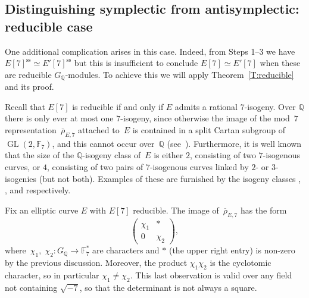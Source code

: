\documentclass[12pt, reqno]{amsart}
\newcommand{\lmfdbeciso}[2]{\href{http://www.lmfdb.org/EllipticCurve/Q/#1/#2}{\text{\rm#1#2}}}
\newcommand{\F}{\mathbb{F}}
\newcommand{\Q}{\mathbb{Q}}
\newcommand{\rhobar}{{\overline{\rho}}}
\DeclareMathOperator{\sss}{ss}
\newcommand{\GL}{\operatorname{GL}}
\numberwithin{equation}{section}
\theoremstyle{definition}
\theoremstyle{remark}
\begin{document}
\subsection{Distinguishing symplectic from antisymplectic: reducible
  case}

One additional complication arises in this case.  Indeed, from Steps
1--3 we have $E[7]^{\sss} \simeq E'[7]^{\sss}$ but this is
insufficient to conclude $E[7] \simeq E'[7]$ when these are reducible
$G_\Q$-modules.  To achieve this we will apply
Theorem~\ref{T:reducible} and its proof.

Recall that $E[7]$ is reducible if and only if $E$ admits a rational
$7$-isogeny.  Over $\Q$ there is only ever at most one $7$-isogeny,
since otherwise the image of the mod~$7$
representation~$\rhobar_{E,7}$ attached to~$E$ is contained in a split
Cartan subgroup of $\GL(2,\F_7)$, and this cannot occur over~$\Q$
(see~\cite[Theorem~1.1]{GL}).  Furthermore, it is well known that the
size of the $\Q$-isogeny class of~$E$ is either $2$, consisting of two
$7$-isogenous curves, or $4$, consisting of two pairs of $7$-isogenous
curves linked by $2$-{} or $3$-isogenies (but not both). Examples of
these are furnished by the isogeny classes \lmfdbeciso{26}{b},
\lmfdbeciso{49}{a}, and \lmfdbeciso{162}{b} respectively.

Fix an elliptic curve $E$ with $E[7]$ reducible. 
The image
of~$\rhobar_{E,7}$ has the form
\[
  \begin{pmatrix}\chi_1&*\\0&\chi_2  \end{pmatrix},
\]
where~$\chi_1, \; \chi_2 : G_{\Q}\to\F_7^*$ are characters and $*$
(the upper right entry) is non-zero by the previous
discussion. Moreover, the product $\chi_1\chi_2$ is the cyclotomic
character, so in particular $\chi_1\not=\chi_2$. This last observation
is valid over any field not containing $\sqrt{-7}$, so that the
determinant is not always a square.
\end{document}
